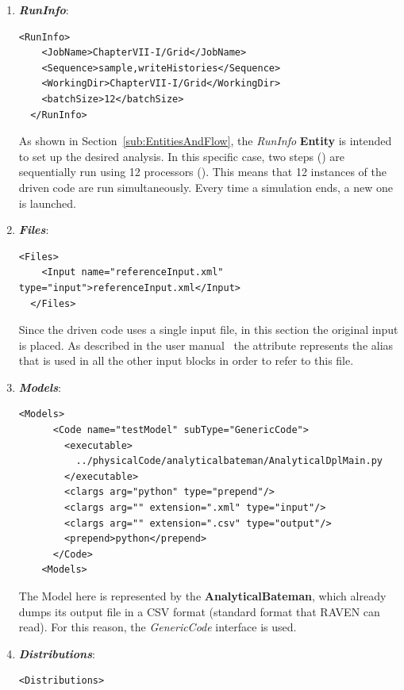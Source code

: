 \begin{enumerate}
   \item \textbf{\textit{RunInfo}}:
\begin{lstlisting}[style=XML,morekeywords={arg,extension,pauseAtEnd,overwrite}]
  <RunInfo>
    <JobName>ChapterVII-I/Grid</JobName>
    <Sequence>sample,writeHistories</Sequence>
    <WorkingDir>ChapterVII-I/Grid</WorkingDir>
    <batchSize>12</batchSize>
  </RunInfo>
\end{lstlisting}   
   As shown in Section~\ref{sub:EntitiesAndFlow}, the \textit{RunInfo} \textbf{Entity} is intended to set up the desired analysis.
   In this specific case, two steps () are sequentially run 
   using 12 processors (). This means that
   12 instances of the driven code are  run simultaneously. 
   Every time a simulation ends, a new one is launched.
   \item \textbf{\textit{Files}}:
\begin{lstlisting}[style=XML,morekeywords={arg,extension,pauseAtEnd,overwrite}]
  <Files>
    <Input name="referenceInput.xml" type="input">referenceInput.xml</Input>
  </Files>
\end{lstlisting}
   Since the driven code uses a single input file, in this section the original input is placed. As described in the user manual~\cite{RAVENuserManual}
   the attribute   represents the alias that is used in all the other input blocks in order to refer to this file.
   \item \textbf{\textit{Models}}:
\begin{lstlisting}[style=XML,morekeywords={arg,extension,pauseAtEnd,overwrite}]
   <Models>
      <Code name="testModel" subType="GenericCode">
        <executable>
          ../physicalCode/analyticalbateman/AnalyticalDplMain.py
        </executable>
        <clargs arg="python" type="prepend"/>
        <clargs arg="" extension=".xml" type="input"/>
        <clargs arg="" extension=".csv" type="output"/>
        <prepend>python</prepend>
      </Code>
    <Models>
\end{lstlisting}
 The Model here is represented by the 
 \textbf{AnalyticalBateman}, which already dumps its output file in a 
 CSV format (standard format that RAVEN can read). For this reason,
 the \textit{GenericCode} interface is used.
   \item \textbf{\textit{Distributions}}:
\begin{lstlisting}[style=XML,morekeywords={arg,extension,pauseAtEnd,overwrite}]
  <Distributions>

\end{lstlisting}
\end{enumerate}
